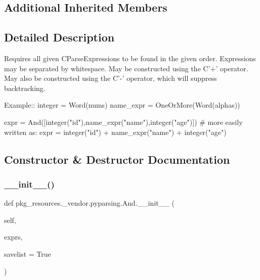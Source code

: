 \subsection*{Additional Inherited Members}


\subsection{Detailed Description}
\begin{DoxyVerb}Requires all given C{ParseExpression}s to be found in the given order.
Expressions may be separated by whitespace.
May be constructed using the C{'+'} operator.
May also be constructed using the C{'-'} operator, which will suppress backtracking.

Example::
    integer = Word(nums)
    name_expr = OneOrMore(Word(alphas))

    expr = And([integer("id"),name_expr("name"),integer("age")])
    # more easily written as:
    expr = integer("id") + name_expr("name") + integer("age")
\end{DoxyVerb}
 

\subsection{Constructor \& Destructor Documentation}
\mbox{\label{classpkg__resources_1_1__vendor_1_1pyparsing_1_1And_a1b82c1bcfc776105763c4702e8986bea}} 
\subsubsection{\texorpdfstring{\+\_\+\+\_\+init\+\_\+\+\_\+()}{\_\_init\_\_()}}
{\footnotesize\ttfamily def pkg\+\_\+resources.\+\_\+vendor.\+pyparsing.\+And.\+\_\+\+\_\+init\+\_\+\+\_\+ (\begin{DoxyParamCaption}\item[{}]{self,  }\item[{}]{exprs,  }\item[{}]{savelist = {\ttfamily True} }\end{DoxyParamCaption})}




